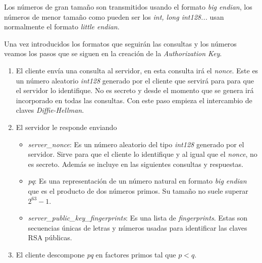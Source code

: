 Los números de gran tamaño son transmitidos usando el formato \emph{big endian}, los números de menor tamaño como pueden ser los \emph{int, long int128...} usan normalmente el formato \emph{little endian}.

Una vez introducidos los formatos que seguirán las consultas y los números veamos los pasos que se siguen en la creación de la \emph{Authorization Key}.

\begin{enumerate}
	\item El cliente envía una consulta al servidor, en esta consulta irá el \emph{nonce}. Este es un número aleatorio \emph{int128} generado por el cliente que servirá para para que el servidor lo identifique. No es secreto y desde el momento que se genera irá incorporado en todas las consultas. Con este paso empieza el intercambio de claves \emph{Diffie-Hellman}.
	
	\item El servidor le responde enviando 
	\begin{itemize}
		\item \emph{server\_nonce}: Es un número aleatorio del tipo \emph{int128} generado por el servidor. Sirve para que el cliente lo identifique y al igual que el \emph{nonce}, no es secreto. Además se incluye en las siguientes consultas y respuestas. 
		\item \emph{pq}: Es una representación de un número natural en formato \emph{big endian} que es el producto de dos números primos. Su tamaño no suele superar $2^{63}-1$.
		\item \emph{server\_public\_key\_fingerprints}: Es una lista de \emph{fingerprints}. Estas son secuencias únicas de letras y números usadas para identificar las claves RSA públicas.
	\end{itemize}

	\item El cliente descompone \emph{pq} en factores primos tal que $p<q$.


\end{enumerate}

